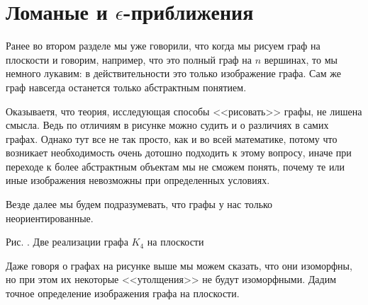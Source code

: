 \section{Ломаные и $\epsilon$-приближения}


	Ранее во втором разделе мы уже говорили, что когда мы рисуем граф на плоскости и говорим, например, что это полный граф на $n$ вершинах, то мы немного лукавим: в действительности это только изображение графа. Сам же граф навсегда останется только абстрактным понятием.
	
	Оказываетя, что теория, исследующая способы <<рисовать>> графы, не лишена смысла. Ведь по отличиям в рисунке можно судить и о различиях в самих графах. Однако тут все не так просто, как и во всей математике, потому что возникает необходимость очень дотошно подходить к этому вопросу, иначе при переходе к более абстрактным объектам мы не сможем понять, почему те или иные изображения невозможны при определенных условиях. 
	
	Везде далее мы будем подразумевать, что графы у нас только неориентированные.

\begin{center}\; \; \; \; \; \; \; \; \; \; 

	\small Рис. \images. Две реализации графа $K_4$ на плоскости
\end{center}

	Даже говоря о графах на рисунке выше мы можем сказать, что они изоморфны, но при этом их некоторые <<утолщения>> не будут изоморфными. Дадим точное определение изображения графа на плоскости.
	
